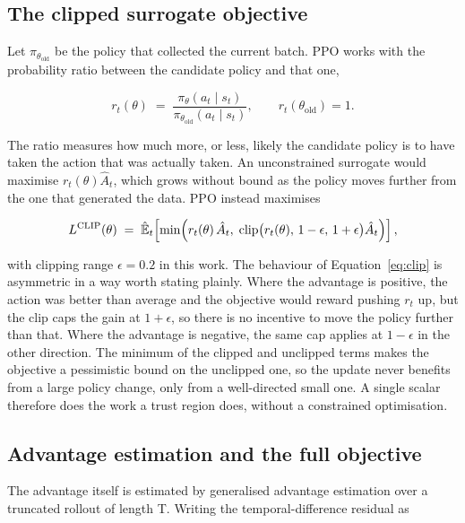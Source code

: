 \subsection{The clipped surrogate objective}\label{sec:m-ppo-clip}

Let \(\pi_{\theta_{\text{old}}}\) be the policy that collected the current batch. PPO works with the
probability ratio between the candidate policy and that one,

\begin{equation}
  r_t(\theta) \;=\; \frac{\pi_\theta(a_t \mid s_t)}{\pi_{\theta_{\text{old}}}(a_t \mid s_t)},
  \qquad r_t(\theta_{\text{old}}) = 1 .
  \label{eq:ratio}
\end{equation}

The ratio measures how much more, or less, likely the candidate policy is to have taken the action
that was actually taken. An unconstrained surrogate would maximise \(r_t(\theta)\hat{A}_t\), which
grows without bound as the policy moves further from the one that generated the data. PPO instead
maximises

\begin{equation}
  L^{\text{CLIP}}(\theta) \;=\;
  \hat{\mathbb{E}}_t\!\left[\min\Bigl(r_t(\theta)\,\hat{A}_t,\;
  \operatorname{clip}\bigl(r_t(\theta),\,1-\epsilon,\,1+\epsilon\bigr)\hat{A}_t\Bigr)\right],
  \label{eq:clip}
\end{equation}

with clipping range \(\epsilon = 0.2\) in this work. The behaviour of
Equation~\ref{eq:clip} is asymmetric in a way worth stating plainly. Where the advantage is
positive, the action was better than average and the objective would reward pushing \(r_t\) up, but
the clip caps the gain at \(1+\epsilon\), so there is no incentive to move the policy further than
that. Where the advantage is negative, the same cap applies at \(1-\epsilon\) in the other
direction. The minimum of the clipped and unclipped terms makes the objective a pessimistic bound
on the unclipped one, so the update never benefits from a large policy change, only from a
well-directed small one. A single scalar therefore does the work a trust region does, without a
constrained optimisation.

\subsection{Advantage estimation and the full objective}\label{sec:m-ppo-gae}

The advantage itself is estimated by generalised advantage estimation over a truncated rollout of
length T. Writing the temporal-difference residual as


